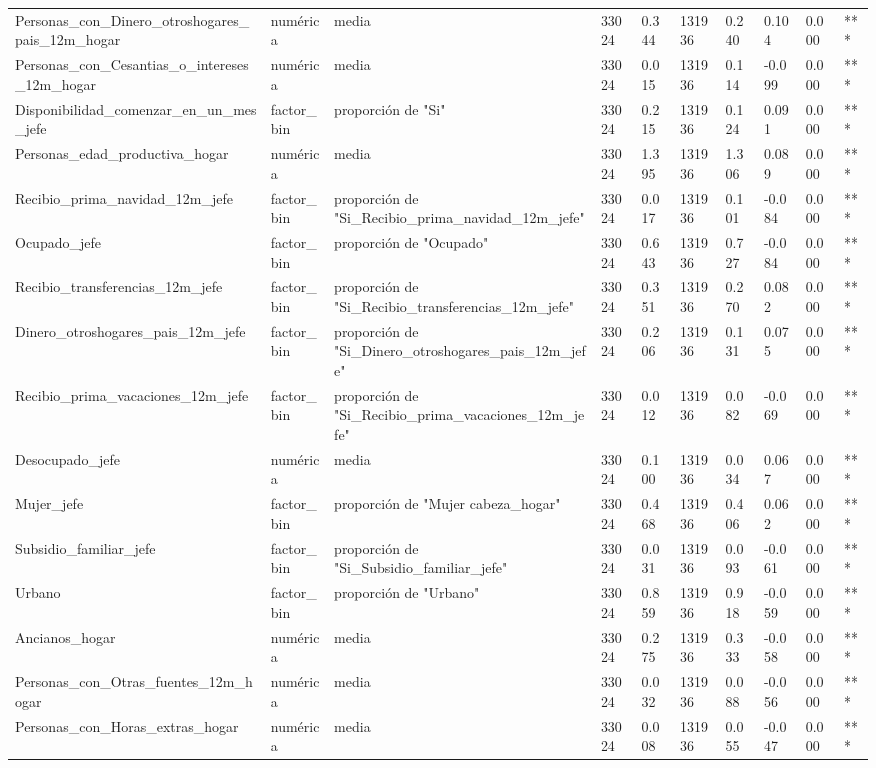 \begin{longtable}[t]{llllllllll}
Personas\_con\_Dinero\_otroshogares\_pais\_12m\_hogar & numérica & media & 33024 & 0.344 & 131936 & 0.240 & 0.104 & 0.000 & ***\\
Personas\_con\_Cesantias\_o\_intereses\_12m\_hogar & numérica & media & 33024 & 0.015 & 131936 & 0.114 & -0.099 & 0.000 & ***\\
Disponibilidad\_comenzar\_en\_un\_mes\_jefe & factor\_bin & proporción de "Si" & 33024 & 0.215 & 131936 & 0.124 & 0.091 & 0.000 & ***\\
Personas\_edad\_productiva\_hogar & numérica & media & 33024 & 1.395 & 131936 & 1.306 & 0.089 & 0.000 & ***\\
Recibio\_prima\_navidad\_12m\_jefe & factor\_bin & proporción de "Si\_Recibio\_prima\_navidad\_12m\_jefe" & 33024 & 0.017 & 131936 & 0.101 & -0.084 & 0.000 & ***\\
Ocupado\_jefe & factor\_bin & proporción de "Ocupado" & 33024 & 0.643 & 131936 & 0.727 & -0.084 & 0.000 & ***\\
Recibio\_transferencias\_12m\_jefe & factor\_bin & proporción de "Si\_Recibio\_transferencias\_12m\_jefe" & 33024 & 0.351 & 131936 & 0.270 & 0.082 & 0.000 & ***\\
Dinero\_otroshogares\_pais\_12m\_jefe & factor\_bin & proporción de "Si\_Dinero\_otroshogares\_pais\_12m\_jefe" & 33024 & 0.206 & 131936 & 0.131 & 0.075 & 0.000 & ***\\
Recibio\_prima\_vacaciones\_12m\_jefe & factor\_bin & proporción de "Si\_Recibio\_prima\_vacaciones\_12m\_jefe" & 33024 & 0.012 & 131936 & 0.082 & -0.069 & 0.000 & ***\\
Desocupado\_jefe & numérica & media & 33024 & 0.100 & 131936 & 0.034 & 0.067 & 0.000 & ***\\
Mujer\_jefe & factor\_bin & proporción de "Mujer cabeza\_hogar" & 33024 & 0.468 & 131936 & 0.406 & 0.062 & 0.000 & ***\\
Subsidio\_familiar\_jefe & factor\_bin & proporción de "Si\_Subsidio\_familiar\_jefe" & 33024 & 0.031 & 131936 & 0.093 & -0.061 & 0.000 & ***\\
Urbano & factor\_bin & proporción de "Urbano" & 33024 & 0.859 & 131936 & 0.918 & -0.059 & 0.000 & ***\\
Ancianos\_hogar & numérica & media & 33024 & 0.275 & 131936 & 0.333 & -0.058 & 0.000 & ***\\
Personas\_con\_Otras\_fuentes\_12m\_hogar & numérica & media & 33024 & 0.032 & 131936 & 0.088 & -0.056 & 0.000 & ***\\
Personas\_con\_Horas\_extras\_hogar & numérica & media & 33024 & 0.008 & 131936 & 0.055 & -0.047 & 0.000 & ***\\

\end{longtable}
